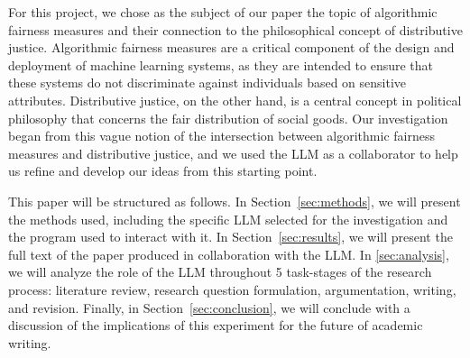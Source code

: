 For this project, we chose as the subject of our paper the topic of algorithmic
fairness measures and their connection to the philosophical concept of
distributive justice. Algorithmic fairness measures are a critical component of
the design and deployment of machine learning systems, as they are intended to
ensure that these systems do not discriminate against individuals based on
sensitive attributes. Distributive justice, on the other hand, is a central
concept in political philosophy that concerns the fair distribution of social
goods. Our investigation began from this vague notion of the intersection
between algorithmic fairness measures and distributive justice, and we used the
LLM as a collaborator to help us refine and develop our ideas from this starting
point.

This paper will be structured as follows. In Section~\ref{sec:methods}, we will
present the methods used, including the specific LLM selected for the
investigation and the program used to interact with it. In
Section~\ref{sec:results}, we will present the full text of the paper produced
in collaboration with the LLM. In \ref{sec:analysis}, we will analyze the role
of the LLM throughout 5 task-stages of the research process: literature review,
research question formulation, argumentation, writing, and revision. Finally,
in Section~\ref{sec:conclusion}, we will conclude with a discussion of the
implications of this experiment for the future of academic writing.
